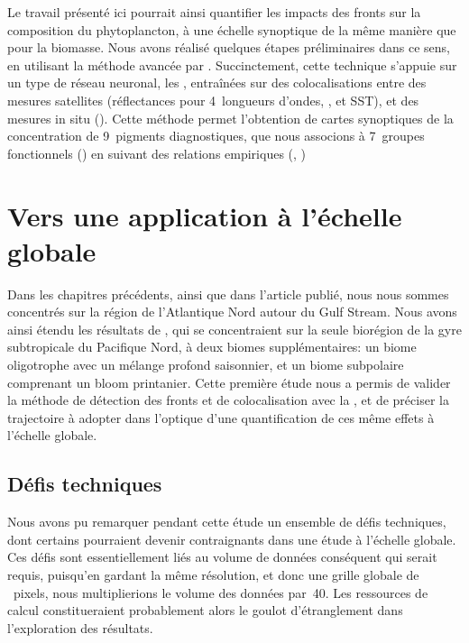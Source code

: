 Le travail présenté ici pourrait ainsi quantifier les impacts des fronts sur la composition du phytoplancton, à une échelle synoptique de la même manière que pour la biomasse.
Nous avons réalisé quelques étapes préliminaires dans ce sens, en utilisant la méthode avancée par \textcite{elhourany_2019,elhourany_2019a}.
Succinctement, cette technique s'appuie sur un type de réseau neuronal, les , entraînées sur des colocalisations entre des mesures satellites (réflectances pour 4~longueurs d'ondes, , et SST), et des mesures in situ ().
Cette méthode permet l'obtention de cartes synoptiques de la concentration de 9~pigments diagnostiques, que nous associons à 7~groupes fonctionnels () en suivant des relations empiriques (, \cite{vidussi_2001,uitz_2006,brewin_2010,hirata_2011})

\section{Vers une application à l'échelle globale}
\label{sec:appl-globale}

Dans les chapitres précédents, ainsi que dans l'article publié, nous nous sommes concentrés sur la région de l'Atlantique Nord autour du Gulf Stream.
Nous avons ainsi étendu les résultats de \textcite{liu_2016}, qui se concentraient sur la seule biorégion de la gyre subtropicale du Pacifique Nord, à deux biomes supplémentaires: un biome oligotrophe avec un mélange profond saisonnier, et un biome subpolaire comprenant un bloom printanier.
Cette première étude nous a permis de valider la méthode de détection des fronts et de colocalisation avec la , et de préciser la trajectoire à adopter dans l'optique d'une quantification de ces même effets à l'échelle globale.

\subsection{Défis techniques}

Nous avons pu remarquer pendant cette étude un ensemble de défis techniques, dont certains pourraient devenir contraignants dans une étude à l'échelle globale.
Ces défis sont essentiellement liés au volume de données conséquent qui serait requis, puisqu'en gardant la même résolution, et donc une grille globale de ~pixels, nous multiplierions le volume des données par~40.
Les ressources de calcul constitueraient probablement alors le goulot d'étranglement dans l'exploration des résultats.


